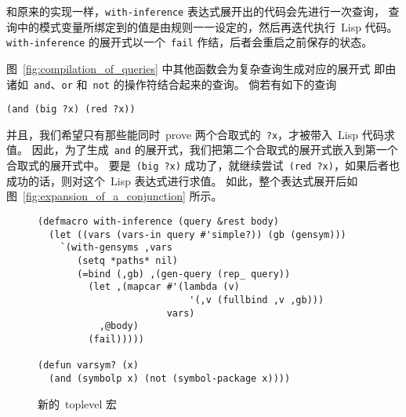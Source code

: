 和原来的实现一样，\verb|with-inference| 表达式展开出的代码会先进行一次查询，
查询中的模式变量所绑定到的值是由规则一一设定的，然后再迭代执行~Lisp 代码。
\verb|with-inference| 的展开式以一个~\verb|fail| 作结，后者会重启之前保存的状态。

图~\ref{fig:compilation_of_queries} 中其他函数会为复杂查询生成对应的展开式\pozhehao{}
即由诸如~\verb|and|、\verb|or| 和~\verb|not| 的操作符结合起来的查询。
倘若有如下的查询
\begin{lstlisting}
(and (big ?x) (red ?x))
\end{lstlisting}
并且，我们希望只有那些能同时~prove 两个合取式的~\verb|?x|，才被带入~Lisp 代码求值。
因此，为了生成~\verb|and| 的展开式，我们把第二个合取式的展开式嵌入到第一个合取式的展开式中。
要是~\verb|(big ?x)| 成功了，就继续尝试~\verb|(red ?x)|，如果后者也成功的话，则对这个~Lisp 表达式进行求值。
如此，整个表达式展开后如图~\ref{fig:expansion_of_a_conjunction} 所示。

\begin{figure}
\begin{lstlisting}
(defmacro with-inference (query &rest body)
  (let ((vars (vars-in query #'simple?)) (gb (gensym)))
    `(with-gensyms ,vars
       (setq *paths* nil)
       (=bind (,gb) ,(gen-query (rep_ query))
         (let ,(mapcar #'(lambda (v)
                           '(,v (fullbind ,v ,gb)))
                       vars)
           ,@body)
         (fail)))))

(defun varsym? (x)
  (and (symbolp x) (not (symbol-package x))))
\end{lstlisting}
\caption{新的~toplevel 宏}
\label{fig:new_toplevel_macro}
\end{figure}

